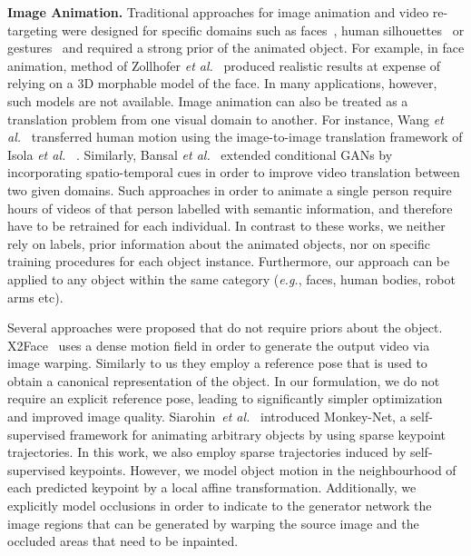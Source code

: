\documentclass{article}
\def\eg{\textit{e.g.}}
\def\etal{\textit{et al.}}
\begin{document}
\textbf{Image Animation.} Traditional approaches for image animation and video re-targeting \cite{cao2014displaced,thies2016face2face,geng20193d} were designed for specific domains such as faces~\cite{zollhofer2018state,Zakharov_2019_CVPR}, human silhouettes~\cite{chan2018everybody,wang2018video,Shysheya_2019_CVPR} or gestures~\cite{hao2018Geaturegan} and required a strong prior of the animated object. For example, in face animation, method of Zollhofer \etal~\cite{zollhofer2018state} produced realistic results at expense of relying on a 3D morphable model of the face. In many applications, however, such models are not available.
Image animation can also be treated as a translation problem from one visual domain to another. For instance, Wang \etal~\cite{wang2018video} transferred human motion using the image-to-image translation framework of Isola \etal~ \cite{pix2pix2016}. Similarly, Bansal \etal~\cite{bansal2018recycle} extended conditional GANs by incorporating spatio-temporal cues in order to improve video translation between two given domains.
Such approaches in order to animate a single person require hours of videos of that person labelled with semantic information, and therefore have to be retrained for each individual. In contrast to these works, we neither rely on labels, prior information about the animated objects, nor on specific training procedures for each object instance. Furthermore, our approach can be applied to any object within the same category (\eg, faces, human bodies, robot arms etc).


Several approaches were proposed that do not require priors about the object. X2Face~\cite{wiles2018x2face} uses a dense motion field in order to generate the output video via image warping. Similarly to us they employ a reference pose that is used to obtain a canonical representation of the object. In our formulation, we do not require an explicit reference pose, leading to significantly simpler optimization and improved image quality. Siarohin~\etal~\cite{siarohin2018animating} introduced Monkey-Net, a self-supervised framework for animating arbitrary objects by using sparse keypoint trajectories. In this work, we also employ sparse trajectories induced by self-supervised keypoints. However, we model object motion in the neighbourhood of each predicted keypoint by a local affine transformation. Additionally, we explicitly model occlusions in order to indicate to the generator network the image regions that can be generated by warping the source image and the occluded areas that need to be inpainted.
 \vspace{-0.2cm}
\end{document}
